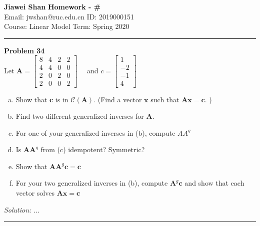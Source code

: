 \documentclass[a4paper, 11pt]{article}
\newenvironment{problem}[2][Problem]
    { \begin{mdframed}[backgroundcolor=gray!20] \textbf{#1 #2} \\}
    {  \end{mdframed}}
\newenvironment{solution}
    {\textit{Solution:}}
    {}
\begin{document}
\noindent
\large\textbf{Jiawei Shan} \hfill \textbf{Homework - \#}   \\
Email: jwshan@ruc.edu.cn \hfill ID: 2019000151 \\
\normalsize Course: Linear Model   \hfill Term: Spring 2020\\

\noindent\rule{7in}{2.8pt}
\begin{problem}{34}
  Let $\mathbf{A}=\left[\begin{array}{cccc}{8} & {4} & {2} & {2} \\ {4} & {4} & {0} & {0} \\ {2} & {0} & {2} & {0} \\ {2} & {0} & {0} & {2}\end{array}\right] \quad$ and $c=\left[\begin{array}{c}{1} \\ {-2} \\ {-1} \\ {4}\end{array}\right]$
  \begin{enumerate}[a.]
    \item Show that $\mathbf{c}$ is in $\mathcal{C}(\mathbf{A}) .$ (Find a vector $\mathbf{x}$ such that $\mathbf{A x}=\mathbf{c} .$ )
    \item Find two different generalized inverses for $\mathbf{A}$.
    \item For one of your generalized inverses in (b), compute $AA^{g}$
    \item Is $\mathbf{A} \mathbf{A}^{g}$ from (c) idempotent? Symmetric?
    \item Show that $\mathbf{A} \mathbf{A}^{g} \mathbf{c}=\mathbf{c}$
    \item For your two generalized inverses in (b), compute $\mathbf{A}^{g} \mathbf{c}$ and show that each vector solves $\mathbf{A x}=\mathbf{c}$
  \end{enumerate}
\end{problem}
\begin{solution}
...
\end{solution}
\noindent\rule{7in}{2.8pt}
\end{document}
